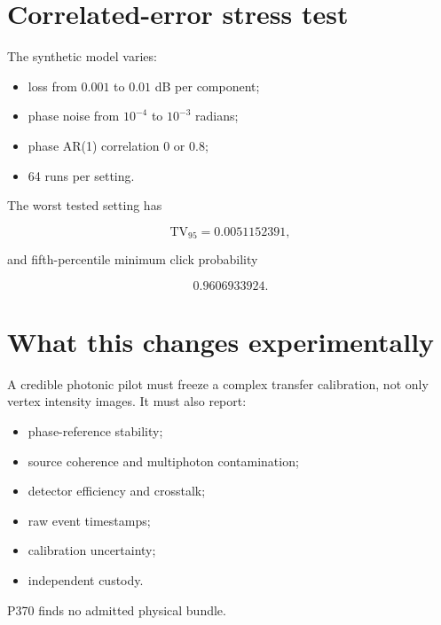 \documentclass[11pt,a4paper,openany]{report}
\begin{document}
\section{Correlated-error stress test}

The synthetic model varies:

\begin{itemize}
\item 
loss from \(0.001\) to \(0.01\) dB per component;

\item 
phase noise from \(10^{-4}\) to \(10^{-3}\) radians;

\item 
phase AR(1) correlation \(0\) or \(0.8\);

\item 
64 runs per setting.

\end{itemize}

The worst tested setting has

\[
\mathrm{TV}_{95}=0.0051152391,
\]

and fifth-percentile minimum click probability

\[
0.9606933924.
\]

\section{What this changes experimentally}

A credible photonic pilot must freeze a complex transfer calibration, not only vertex intensity images. It must also report:

\begin{itemize}
\item 
phase-reference stability;

\item 
source coherence and multiphoton contamination;

\item 
detector efficiency and crosstalk;

\item 
raw event timestamps;

\item 
calibration uncertainty;

\item 
independent custody.

\end{itemize}

P370 finds no admitted physical bundle.
\end{document}
